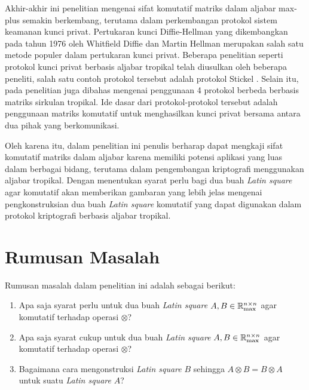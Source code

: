 Akhir-akhir ini penelitian mengenai sifat komutatif matriks dalam aljabar max-plus semakin berkembang, terutama dalam perkembangan protokol sistem keamanan kunci privat.
Pertukaran kunci Diffie-Hellman yang dikembangkan pada tahun 1976 oleh Whitfield Diffie dan Martin Hellman merupakan salah satu metode populer dalam pertukaran kunci privat.
Beberapa penelitian seperti protokol kunci privat berbasis aljabar tropikal telah diusulkan oleh beberapa peneliti, salah satu contoh protokol tersebut adalah protokol Stickel \parencite{alhussaini2024securityinitialtropical,muanalifah2020modifyingtropical,alhussaini2024tropicaltwosided}.
Selain itu, pada penelitian \textcite{buchinskiy2024analysisfour} juga dibahas mengenai penggunaan 4 protokol berbeda berbasis matriks sirkulan tropikal. Ide dasar dari protokol-protokol tersebut adalah penggunaan matriks komutatif untuk menghasilkan kunci privat bersama antara dua pihak yang berkomunikasi.

Oleh karena itu, dalam penelitian ini penulis berharap dapat mengkaji sifat komutatif matriks dalam aljabar karena memiliki potensi aplikasi yang luas dalam berbagai bidang, terutama dalam pengembangan kriptografi menggunakan aljabar tropikal.
Dengan menentukan syarat perlu bagi dua buah \textit{Latin square} agar komutatif akan memberikan gambaran yang lebih jelas mengenai pengkonstruksian dua buah \textit{Latin square} komutatif yang dapat digunakan dalam protokol kriptografi berbasis aljabar tropikal.

\section{Rumusan Masalah}
Rumusan masalah dalam penelitian ini adalah sebagai berikut:
\begin{enumerate}
  \item Apa saja syarat perlu untuk dua buah \textit{Latin square} $A,B\in\mathbb{R}^{n\times n}_{\max}$ agar komutatif terhadap operasi $\otimes$?
  \item Apa saja syarat cukup untuk dua buah \textit{Latin square} $A,B\in\mathbb{R}^{n\times n}_{\max}$ agar komutatif terhadap operasi $\otimes$?
  \item Bagaimana cara mengonstruksi \textit{Latin square} $B$ sehingga $A \otimes B = B \otimes A$ untuk suatu \textit{Latin square} $A$?
\end{enumerate}

